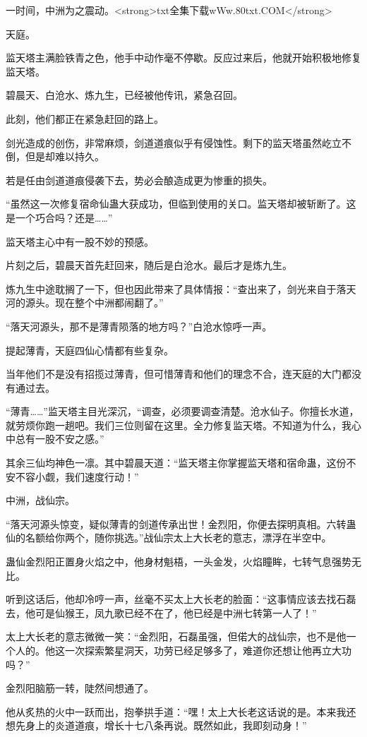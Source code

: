 \begin{this_body}
一时间，中洲为之震动。<strong>txt全集下载wWw.80txt.COM</strong>

天庭。

监天塔主满脸铁青之色，他手中动作毫不停歇。反应过来后，他就开始积极地修复监天塔。

碧晨天、白沧水、炼九生，已经被他传讯，紧急召回。

此刻，他们都正在紧急赶回的路上。

剑光造成的创伤，非常麻烦，剑道道痕似乎有侵蚀性。剩下的监天塔虽然屹立不倒，但是却难以持久。

若是任由剑道道痕侵袭下去，势必会酿造成更为惨重的损失。

“虽然这一次修复宿命仙蛊大获成功，但临到使用的关口。监天塔却被斩断了。这是一个巧合吗？还是……”

监天塔主心中有一股不妙的预感。

片刻之后，碧晨天首先赶回来，随后是白沧水。最后才是炼九生。

炼九生中途耽搁了一下，但也因此带来了具体情报：“查出来了，剑光来自于落天河的源头。现在整个中洲都闹翻了。”

“落天河源头，那不是薄青陨落的地方吗？”白沧水惊呼一声。

提起薄青，天庭四仙心情都有些复杂。

当年他们不是没有招揽过薄青，但可惜薄青和他们的理念不合，连天庭的大门都没有通过去。

“薄青……”监天塔主目光深沉，“调查，必须要调查清楚。沧水仙子。你擅长水道，就劳烦你跑一趟吧。我们三位则留在这里。全力修复监天塔。不知道为什么，我心中总有一股不安之感。”

其余三仙均神色一凛。其中碧晨天道：“监天塔主你掌握监天塔和宿命蛊，这份不安不容小觑，我们速度行动！”

中洲，战仙宗。

“落天河源头惊变，疑似薄青的剑道传承出世！金烈阳，你便去探明真相。六转蛊仙的名额给你两个，随你挑选。”战仙宗太上大长老的意志，漂浮在半空中。

蛊仙金烈阳正置身火焰之中，他身材魁梧，一头金发，火焰瞳眸，七转气息强势无比。

听到这话后，他却冷哼一声，丝毫不买太上大长老的脸面：“这事情应该去找石磊去，他可是仙猴王，凤九歌已经不在了，他已经是中洲七转第一人了！”

太上大长老的意志微微一笑：“金烈阳，石磊虽强，但偌大的战仙宗，也不是他一个人的。他这一次探索繁星洞天，功劳已经足够多了，难道你还想让他再立大功吗？”

金烈阳脑筋一转，陡然间想通了。

他从炙热的火中一跃而出，抱拳拱手道：“嘿！太上大长老这话说的是。本来我还想先身上的炎道道痕，增长十七八条再说。既然如此，我即刻动身！”


\end{this_body}
